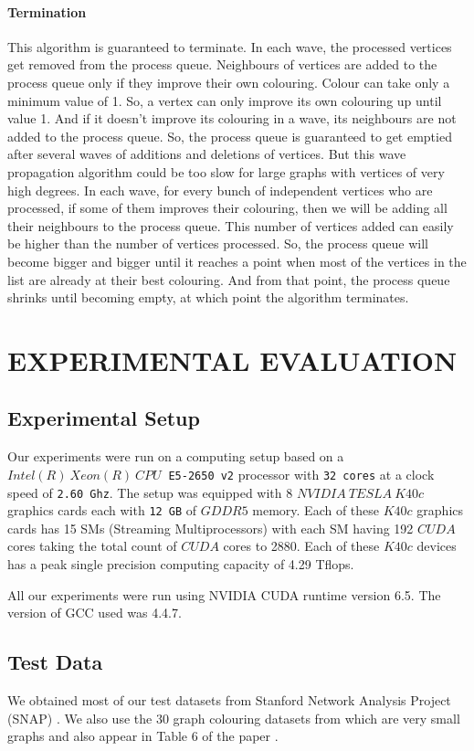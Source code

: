 \documentclass[MTech]{iitmdiss}
\begin{document}
\subsubsection{Termination}
This algorithm is guaranteed to terminate. In each wave, the processed vertices get removed from the process queue. Neighbours of vertices are added to the process queue only if they improve their own colouring. Colour can take only a minimum value of 1. So, a vertex can only improve its own colouring up until value 1. And if it doesn't improve its colouring in a wave, its neighbours are not added to the process queue. So, the process queue is guaranteed to get emptied after several waves of additions and deletions of vertices. But this wave propagation algorithm could be too slow for large graphs with vertices of very high degrees. In each wave, for every bunch of independent vertices who are processed, if some of them improves their colouring, then we will be adding all their neighbours to the process queue. This number of vertices added can easily be higher than the number of vertices processed. So, the process queue will become bigger and bigger until it reaches a point when most of the vertices in the list are already at their best colouring. And from that point, the process queue shrinks until becoming empty, at which point the algorithm terminates. 



\chapter{EXPERIMENTAL EVALUATION}
\section{Experimental Setup}
Our experiments were run on a computing setup based on a $Intel(R) \: Xeon(R) \: CPU \: $ \verb+E5-2650 v2+ processor with \verb+32 cores+ at a clock speed of \verb+2.60 Ghz+. The setup was equipped with 8 $NVIDIA \: TESLA \: K40c$ graphics cards each with \verb+12 GB+ of $GDDR5$ memory. Each of these $K40c$ graphics cards has 15 SMs (Streaming Multiprocessors) with each SM having 192 $CUDA$ cores taking the total count of $CUDA$ cores to 2880. Each of these $K40c$ devices has a peak single precision computing capacity of 4.29 Tflops.

All our experiments were run using NVIDIA CUDA runtime version 6.5. The version of GCC used was 4.4.7. 
\section{Test Data}
We obtained most of our test datasets from Stanford Network Analysis Project (SNAP) \citep{snapnets}. We also use the 30 graph colouring datasets from \citet{Beasley1990} which are very small graphs and also appear in Table 6 of the paper \cite{ref1}.
\end{document}
